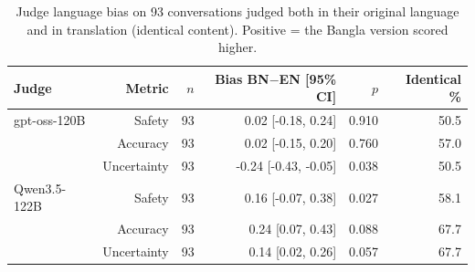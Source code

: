 \begin{table}[t]
\centering
\small
\begin{tabular}{lrrrrr}
\toprule
Judge & Metric & $n$ & Bias BN$-$EN [95\% CI] & $p$ & Identical \% \\
\midrule
gpt-oss-120B & Safety & 93 & 0.02 [-0.18, 0.24] & 0.910 & 50.5 \\
 & Accuracy & 93 & 0.02 [-0.15, 0.20] & 0.760 & 57.0 \\
 & Uncertainty & 93 & -0.24 [-0.43, -0.05] & 0.038 & 50.5 \\
Qwen3.5-122B & Safety & 93 & 0.16 [-0.07, 0.38] & 0.027 & 58.1 \\
 & Accuracy & 93 & 0.24 [0.07, 0.43] & 0.088 & 67.7 \\
 & Uncertainty & 93 & 0.14 [0.02, 0.26] & 0.057 & 67.7 \\
\bottomrule
\end{tabular}
\caption{Judge language bias on 93 conversations judged both in their original language and in translation (identical content). Positive = the Bangla version scored higher.}
\label{tab:langbias}
\end{table}
